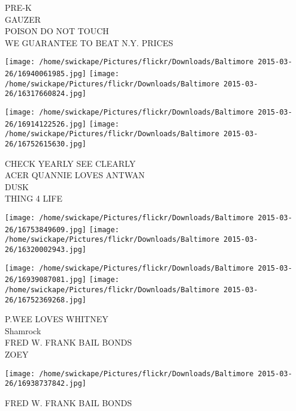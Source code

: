 \documentclass[10pt,letterpaper]{article}
\begin{document}
PRE{-}K\\
GAUZER\\
POISON DO NOT TOUCH\\
WE GUARANTEE TO BEAT N.Y. PRICES\\
\pagebreak

\texttt{[image: /home/swickape/Pictures/flickr/Downloads/Baltimore 2015-03-26/16940061985.jpg]}
\texttt{[image: /home/swickape/Pictures/flickr/Downloads/Baltimore 2015-03-26/16317660824.jpg]}

\texttt{[image: /home/swickape/Pictures/flickr/Downloads/Baltimore 2015-03-26/16914122526.jpg]}
\texttt{[image: /home/swickape/Pictures/flickr/Downloads/Baltimore 2015-03-26/16752615630.jpg]}

CHECK YEARLY SEE CLEARLY\\
ACER QUANNIE LOVES ANTWAN\\
DUSK\\
THING 4 LIFE\\
\pagebreak

\texttt{[image: /home/swickape/Pictures/flickr/Downloads/Baltimore 2015-03-26/16753849609.jpg]}
\texttt{[image: /home/swickape/Pictures/flickr/Downloads/Baltimore 2015-03-26/16320002943.jpg]}

\texttt{[image: /home/swickape/Pictures/flickr/Downloads/Baltimore 2015-03-26/16939087081.jpg]}
\texttt{[image: /home/swickape/Pictures/flickr/Downloads/Baltimore 2015-03-26/16752369268.jpg]}

P.WEE LOVES WHITNEY\\
Shamrock\\
FRED W. FRANK BAIL BONDS\\
ZOEY\\
\pagebreak

\texttt{[image: /home/swickape/Pictures/flickr/Downloads/Baltimore 2015-03-26/16938737842.jpg]}

FRED W. FRANK BAIL BONDS\\
\pagebreak
\end{document}
